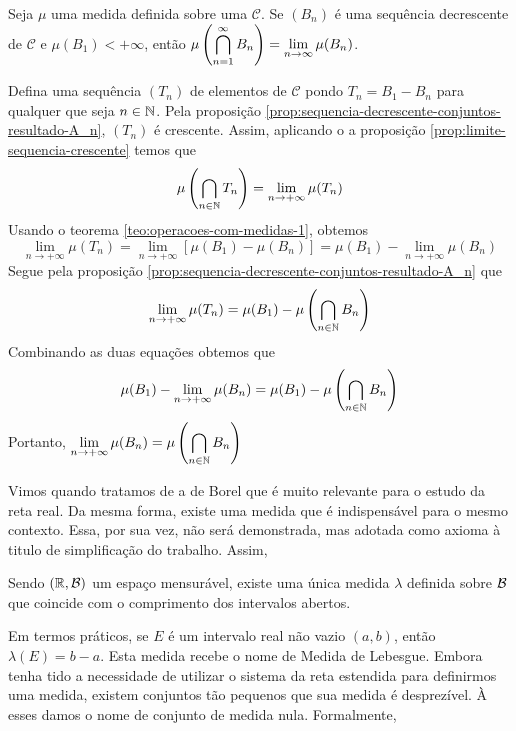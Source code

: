 \begin{proposition}
Seja $\mu$ uma medida definida sobre uma \sigal $\mathcal{C}$.
Se $(B_n)$ é uma sequência decrescente de $\mathcal{C}$ e $\mu(B_1) < +\infty$, então 
$\mu\left(\displaystyle \bigcap_{n = 1}^\infty B_n\right) = \displaystyle \lim_{n \to \infty} \mu(B_n)$.
\end{proposition} 
\begin{prova}
    Defina uma sequência $(T_n)$ de elementos de $\mathcal{C}$ pondo $T_n = B_1 - B_n$ para qualquer que seja $n \in \operatorname{\mathbb{N}}$.
    Pela proposição \ref{prop:sequencia-decrescente-conjuntos-resultado-A_n}, $(T_n)$ é crescente.
    Assim, aplicando o a proposição \ref{prop:limite-sequencia-crescente} temos que 
    $$
    \mu\left(\bigcap_{n \in \operatorname{\mathbb{N}}} T_n\right) = \lim_{n \to +\infty} \mu(T_n)
    $$
    Usando o teorema \ref{teo:operacoes-com-medidas-1}, obtemos
    $$
    \lim_{n \to +\infty} \mu(T_n) = \lim_{n \to +\infty} [\mu(B_1) - \mu(B_n)] = \mu(B_1) - \lim_{n \to +\infty} \mu(B_n)
    $$
    Segue pela proposição \ref{prop:sequencia-decrescente-conjuntos-resultado-A_n} que 
    $$
    \lim_{n \to +\infty} \mu(T_n) = \mu(B_1) - \mu\left(\bigcap_{n \in \operatorname{\mathbb{N}}} B_n\right)
    $$
    Combinando as duas equações obtemos que
    \begin{align*}
        \mu(B_1) - \lim_{n \to +\infty} \mu(B_n) = \mu(B_1) - \mu\left(\bigcap_{n \in \operatorname{\mathbb{N}}} B_n\right)
    \end{align*}
    Portanto, $\displaystyle \lim_{n \to +\infty} \mu(B_n) = \mu\left(\bigcap_{n \in \operatorname{\mathbb{N}}} B_n\right)$
\end{prova}

Vimos quando tratamos de \sigals a \sigal de Borel que é muito relevante para o estudo da reta real.
Da mesma forma, existe uma medida que é indispensável para o mesmo contexto.
Essa, por sua vez, não será demonstrada, mas adotada como axioma à titulo de simplificação do trabalho.
Assim, 

\begin{axiom}
	\label{ax: medida de lebesgue}
	Sendo $(\mathbb{R}, \operatorname{\mathcal{B}})$ um espaço mensurável, existe uma única medida $\lambda$ definida sobre $\operatorname{\mathcal{B}}$ que coincide com o comprimento dos intervalos abertos.
\end{axiom}

Em termos práticos, se $E$ é um intervalo real não vazio $(a,b)$, então $\lambda(E) = b - a$.
Esta medida recebe o nome de Medida de Lebesgue. 
Embora tenha tido a necessidade de utilizar o sistema da reta estendida para definirmos uma medida, existem conjuntos tão pequenos que sua medida é desprezível.
À esses damos o nome de conjunto de medida nula.
Formalmente,

